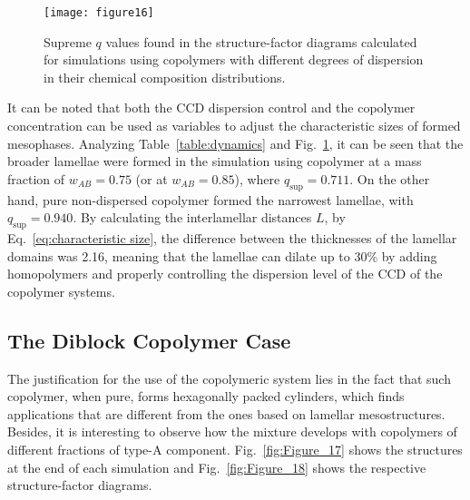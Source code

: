 \documentclass[
aip,
jcp,
reprint,
]{revtex4-1}
\begin{document}
\begin{figure}
	\centering
	\texttt{[image: figure16]}
	\caption{Supreme $q$ values found in the structure-factor diagrams calculated for simulations using copolymers with different degrees of dispersion in their chemical composition distributions.}
	\label{fig:Figure_16}
\end{figure}

It can be noted that both the CCD dispersion control and the copolymer concentration can be used as variables to adjust the characteristic sizes of formed mesophases.
Analyzing Table~\ref{table:dynamics} and Fig.~\ref{fig:Figure_16}, it can be seen that the broader lamellae were formed in the simulation using copolymer  at a mass fraction of $w_{AB}=0.75$ (or  at $w_{AB}=0.85$), where $q_\mathrm{sup}=0.711$.
On the other hand, pure  non-dispersed copolymer formed the narrowest lamellae, with $q_\mathrm{sup}=0.940$.
By calculating the interlamellar distances $L$, by Eq.~\eqref{eq:characteristic size}, the difference between the thicknesses of the lamellar domains was 2.16, meaning that the lamellae can dilate up to 30\% by adding homopolymers and properly controlling the dispersion level of the CCD of the copolymer systems.

\subsection{The  Diblock Copolymer Case}

The justification for the use of the  copolymeric system lies in the fact that such copolymer, when pure, forms hexagonally packed cylinders, which finds applications that are different from the ones based on lamellar mesostructures. Besides, it is interesting to observe how the mixture develops with copolymers of different fractions of type-A component.
Fig.~\ref{fig:Figure_17} shows the structures at the end of each simulation and Fig.~\ref{fig:Figure_18} shows the respective structure-factor diagrams. 
\end{document}
